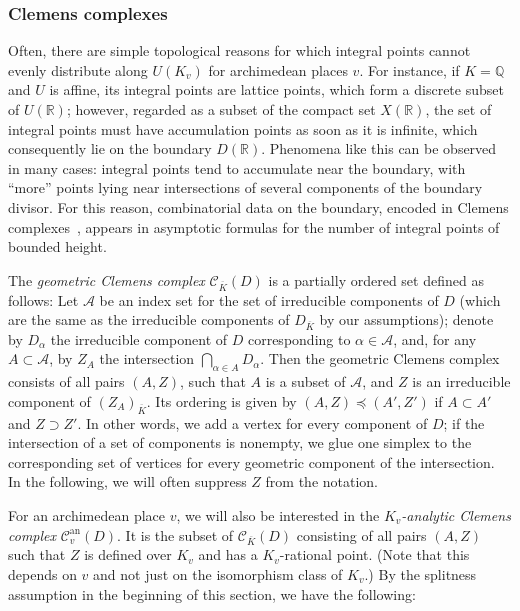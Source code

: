 \documentclass[a4paper, twoside, 10pt]{amsart}
\newcommand{\cA}{\mathcal{A}}
\newcommand{\cC}{\mathcal{C}}
\newcommand{\RR}{\mathbb{R}}
\newcommand{\Kbar}{{\overline{K}}}
\newcommand{\QQ}{\mathbb{Q}}
\newcommand{\Can}{\cC^{\mathrm{an}}}
\theoremstyle{definition}
\begin{document}
\subsubsection{Clemens complexes}\label{sssec:Clemens-complexes}

Often, there are simple topological reasons for which integral points cannot evenly distribute along $U(K_v)$ for archimedean places $v$. For instance, if $K=\QQ$ and $U$ is affine, its integral points are lattice points, which form a discrete subset of $U(\RR)$; however, regarded as a subset of the compact set $X(\RR)$, the set of integral points must have accumulation points as soon as it is infinite, which consequently lie on the boundary $D(\RR)$.
Phenomena like this can be observed in many cases: integral points tend to accumulate near the boundary, with ``more'' points lying near intersections of several components of the boundary divisor. For this reason, combinatorial data on the boundary, encoded in Clemens complexes~\cite[\S~3.1]{MR2740045}, appears in asymptotic formulas for the number of integral points of bounded height.

The \emph{geometric Clemens complex} $\cC_\Kbar(D)$ is a partially ordered set defined as follows: Let $\cA$ be an index set for the set of irreducible components of $D$ (which are the same as the irreducible components of $D_\Kbar$ by our assumptions); denote by $D_\alpha$ the irreducible component of $D$ corresponding to $\alpha\in \cA$, and, for any $A\subset\cA$, by $Z_A$ the intersection $\bigcap_{\alpha\in A}D_\alpha$.
Then the geometric Clemens complex consists of all pairs $(A,Z)$, such that $A$ is a subset of $\cA$, and $Z$ is an irreducible component of $(Z_A)_\Kbar$.
Its ordering is given by $(A,Z)\preceq(A',Z')$ if $A\subset A'$ and $Z\supset Z'$.
In other words, we add a vertex for every component of $D$; if the intersection of a set of components is nonempty, we glue one simplex to the corresponding set of vertices for every geometric component of the intersection. In the following, we will often suppress $Z$ from the notation.

For an archimedean place $v$, we will also be interested in the \emph{$K_v$-analytic Clemens complex} $\Can_{v}(D)$. It is the subset of $\cC_\Kbar(D)$ consisting of all pairs $(A,Z)$ such that $Z$ is defined over $K_v$ and has a $K_v$-rational point. (Note that this depends on $v$ and not just on the isomorphism class of $K_v$.) By the splitness assumption in the beginning of this section, we have the following:
\end{document}
